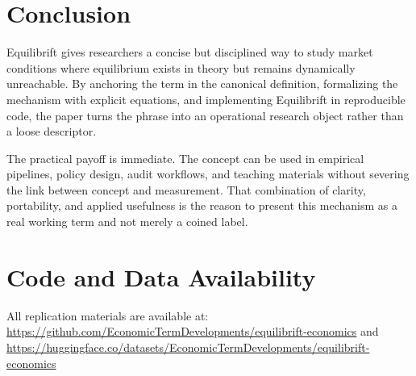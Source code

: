 \documentclass[12pt]{article}
\begin{document}
\section{Conclusion}
Equilibrift gives researchers a concise but disciplined way to study market conditions where equilibrium exists in theory but remains dynamically unreachable. By anchoring the term in the canonical definition, formalizing the mechanism with explicit equations, and implementing Equilibrift in reproducible code, the paper turns the phrase into an operational research object rather than a loose descriptor.

The practical payoff is immediate. The concept can be used in empirical pipelines, policy design, audit workflows, and teaching materials without severing the link between concept and measurement. That combination of clarity, portability, and applied usefulness is the reason to present this mechanism as a real working term and not merely a coined label.

\section*{Code and Data Availability}
All replication materials are available at:
\url{https://github.com/EconomicTermDevelopments/equilibrift-economics} and
\url{https://huggingface.co/datasets/EconomicTermDevelopments/equilibrift-economics}
\end{document}
